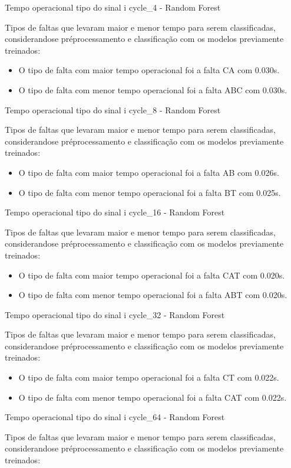 Tempo operacional tipo do sinal i cycle_4 - Random Forest
\item Tipos de faltas que levaram maior e menor tempo para serem classificadas, considerando\hyph se pré\hyph processamento e classificação com os modelos previamente treinados:
\begin{itemize}
\item O tipo de falta com maior tempo operacional foi a falta CA com 0.030s.
\item O tipo de falta com menor tempo operacional foi a falta ABC com 0.030s.
\end{itemize}
Tempo operacional tipo do sinal i cycle_8 - Random Forest
\item Tipos de faltas que levaram maior e menor tempo para serem classificadas, considerando\hyph se pré\hyph processamento e classificação com os modelos previamente treinados:
\begin{itemize}
\item O tipo de falta com maior tempo operacional foi a falta AB com 0.026s.
\item O tipo de falta com menor tempo operacional foi a falta BT com 0.025s.
\end{itemize}
Tempo operacional tipo do sinal i cycle_16 - Random Forest
\item Tipos de faltas que levaram maior e menor tempo para serem classificadas, considerando\hyph se pré\hyph processamento e classificação com os modelos previamente treinados:
\begin{itemize}
\item O tipo de falta com maior tempo operacional foi a falta CAT com 0.020s.
\item O tipo de falta com menor tempo operacional foi a falta ABT com 0.020s.
\end{itemize}
Tempo operacional tipo do sinal i cycle_32 - Random Forest
\item Tipos de faltas que levaram maior e menor tempo para serem classificadas, considerando\hyph se pré\hyph processamento e classificação com os modelos previamente treinados:
\begin{itemize}
\item O tipo de falta com maior tempo operacional foi a falta CT com 0.022s.
\item O tipo de falta com menor tempo operacional foi a falta CAT com 0.022s.
\end{itemize}
Tempo operacional tipo do sinal i cycle_64 - Random Forest
\item Tipos de faltas que levaram maior e menor tempo para serem classificadas, considerando\hyph se pré\hyph processamento e classificação com os modelos previamente treinados:
